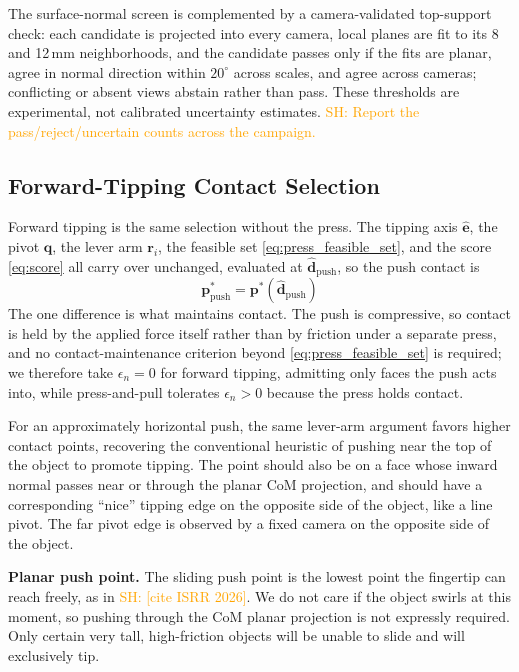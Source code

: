 \documentclass[10pt, conference]{IEEEtran}
\newcommand{\sh}[1]{\textcolor{orange}{SH: #1}}
\newcommand{\isrr}{\sh{[cite ISRR 2026]}}
\begin{document}
The surface-normal screen is complemented by a camera-validated top-support check: each candidate is projected into every camera, local planes are fit to its 8 and 12\,mm neighborhoods, and the candidate passes only if the fits are planar, agree in normal direction within $20^\circ$ across scales, and agree across cameras; conflicting or absent views abstain rather than pass. These thresholds are experimental, not calibrated uncertainty estimates. \sh{Report the pass/reject/uncertain counts across the campaign.}

\subsection{Forward-Tipping Contact Selection}
\label{sec:forward_tip_selection}

Forward tipping is the same selection without the press. The tipping axis $\hat{\mathbf e}$, the pivot $\mathbf q$, the lever arm $\mathbf r_i$, the feasible set \eqref{eq:press_feasible_set}, and the score \eqref{eq:score} all carry over unchanged, evaluated at $\hat{\mathbf d}_{\mathrm{push}}$, so the
push contact is
\begin{equation}
    \boxed{
    \mathbf p^*_{\mathrm{push}}
    =
    \mathbf p^*(\hat{\mathbf d}_{\mathrm{push}})
    }
    \label{eq:forward_tip_selection}
\end{equation}
The one difference is what maintains contact. The push is compressive, so contact is held by the applied force itself rather than by friction under a separate press, and no contact-maintenance criterion beyond
\eqref{eq:press_feasible_set} is required; we therefore take $\epsilon_n = 0$ for forward tipping, admitting only faces the push acts into, while press-and-pull tolerates $\epsilon_n > 0$ because the press holds contact.

For an approximately horizontal push, the same lever-arm argument favors higher contact points, recovering the conventional heuristic of pushing near the top of the object to promote tipping. The point should also be on a face whose inward normal passes near or through the planar CoM projection, and should have a corresponding ``nice'' tipping edge on the opposite side of the object, like a line pivot. The far pivot edge is observed by a fixed camera on the opposite side of the object.

\noindent \textbf{Planar push point.} The sliding push point is the lowest point the fingertip can reach freely, as in \isrr{}. We do not care if the object swirls at this moment, so pushing through the CoM planar projection is not expressly required. Only certain very tall, high-friction objects will be unable to slide and will exclusively tip.
\end{document}
